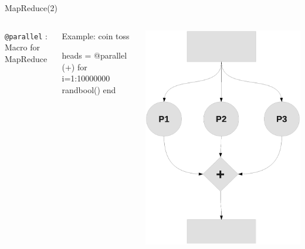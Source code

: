 \documentclass{beamer}
\begin{document}
	\begin{frame}[fragile]{MapReduce(2)}
		\begin{columns}
		\verb+@parallel+ : Macro for MapReduce
		\begin{block}{Example: coin toss}	
		\begin{semiverbatim}
		heads = 
		@parallel (+) for i=1:10000000
		  randbool()
		end
		\end{semiverbatim}
		\end{block}
		\includegraphics[width = \textwidth]{figures/parallel_map.eps}
		\end{columns}
	\end{frame}
\end{document}
